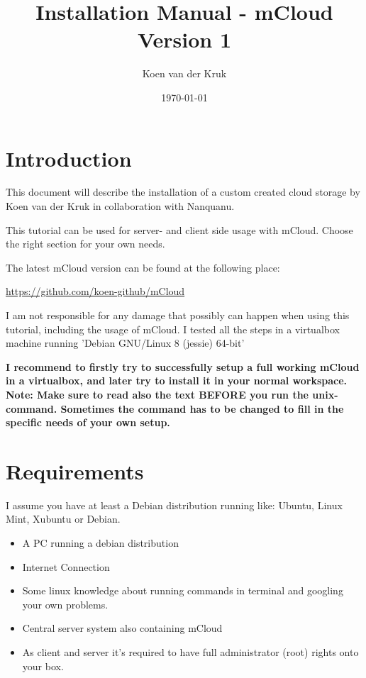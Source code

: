 \documentclass{article}
\title{Installation Manual - mCloud\\Version 1}
\author{Koen van der Kruk}
\date{\today}
\begin{document}
\maketitle

\tableofcontents

\newpage
\section{Introduction}
This document will describe the installation of a custom created cloud storage by Koen van der Kruk in collaboration with Nanquanu. 

This tutorial can be used for server- and client side usage with mCloud. Choose the right section for your own needs. 

The latest mCloud version can be found at the following place:

\url{https://github.com/koen-github/mCloud}

I am not responsible for any damage that possibly can happen when using this tutorial, including the usage of mCloud. 
I tested all the steps in a virtualbox machine running 'Debian GNU/Linux 8 (jessie) 64-bit'



\textbf{I recommend to firstly try to successfully setup a full working mCloud in a virtualbox, and later try to install it in your normal workspace.
Note: Make sure to read also the text BEFORE you run the unix-command. Sometimes the command has to be changed to fill in the specific needs of your own setup.}



\section{Requirements}
I assume you have at least a Debian distribution running like: Ubuntu, Linux Mint, Xubuntu or Debian. 

\begin{itemize}
    \item A PC running a debian distribution
    \item Internet Connection
    \item Some linux knowledge about running commands in terminal and googling your own problems.
    \item Central server system also containing mCloud
    \item As client and server it's required to have full administrator (root) rights onto your box.
\end{itemize}
\end{document}
